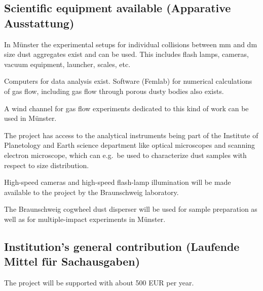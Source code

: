 \subsection{Scientific equipment available (Apparative Ausstattung)}
%
%
\begin{compactitemize}
\item In M\"unster the experimental setups for individual collisions between mm and dm size
dust aggregates exist and can be used. This includes flash lamps, cameras, vacuum equipment, launcher,
scales, etc.

\item Computers for data analysis exist. Software (Femlab) for numerical calculations of gas flow, including gas
flow through porous dusty bodies also exists.

\item A wind channel for gas flow experiments dedicated to this kind of work can be used in
M\"unster.

\item The project has access to the analytical instruments being part of the Institute
of Planetology and Earth science department like optical microscopes and scanning
electron microscope, which can e.g.\ be used to characterize dust samples with respect
to size distribution.

\item High-speed cameras and high-speed flash-lamp illumination
will be made available to the project by the Braunschweig
laboratory.

\item The Braunschweig cogwheel dust disperser will be used for
sample preparation as well as for multiple-impact experiments in
M\"unster.

\end{compactitemize}


\subsection{Institution's general contribution (Laufende Mittel f\"ur Sachausgaben)}
%
%

The project will be supported with about 500 EUR per year.


